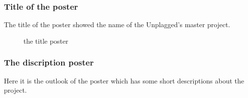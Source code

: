 \subsubsection{Title of the poster}
The title of the poster showed the name of the Unplagged's master project.

\begin{figure}[!h]
  \centering
  \caption{the title poster}
  \label{fig:poster_title}
\end{figure}

\pagebreak

\subsubsection{The discription poster}

Here it is the outlook of the poster which has some short descriptions about the project.

